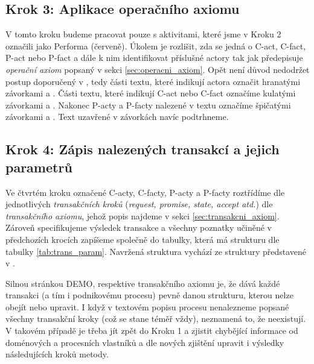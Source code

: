 \documentclass[]{article}
\begin{document}
\subsection{Krok 3: Aplikace operačního axiomu}
V tomto kroku budeme pracovat pouze s aktivitami, které jsme v Kroku 2 označili jako Performa (červeně). Úkolem je rozlišit, zda se jedná o C-act, C-fact, P-act nebo P-fact a dále k nim identifikovat příslušné actory tak jak předepisuje \textit{operační axiom} popsaný v sekci \ref{sec:operacni_axiom}. Opět není důvod nedodržet postup doporučený v \cite{Dietz2006}, tedy části textu, které indikují actora označit hranatými závorkami \uv{[} a \uv{]}. Části textu, které indikují C-act nebo C-fact označíme kulatými závorkami \uv{(} a \uv{)}. Nakonec P-acty a P-facty nalezené v textu označíme špičatými závorkami \uv{$<$}  a \uv{$>$}. Text uzavřené v závorkách navíc podtrhneme.

\subsection{Krok 4: Zápis nalezených transakcí a jejich parametrů}
Ve čtvrtém kroku označené C-acty, C-facty, P-acty a P-facty roztřídíme dle jednotlivých \textit{transakčních kroků} (\textit{request, promise, state, accept atd.}) dle \textit{transakčního axiomu}, jehož popis najdeme v sekci \ref{sec:transakcni_axiom}. Zároveň specifikujeme výsledek transakce a všechny poznatky učiněné v předchozích krocích zapíšeme společně do tabulky, která má strukturu dle tabulky \ref{tab:trans_param}. Navržená struktura vychází ze struktury představené v \cite{Naplava2015}.

Silnou stránkou DEMO, respektive transakčního axiomu je, že dává každé transakci (a tím i podnikovému procesu) pevně danou strukturu, kterou nelze obejít nebo upravit. I když v textovém popisu procesu nenalezneme popsané všechny transakční kroky (což se stane téměř vždy), neznamená to, že neexistují. V takovém případě je třeba jít zpět do Kroku 1 a zjistit chybějící informace od doménových a procesních vlastníků a dle nových zjištění upravit i výsledky následujících kroků metody.
\end{document}
